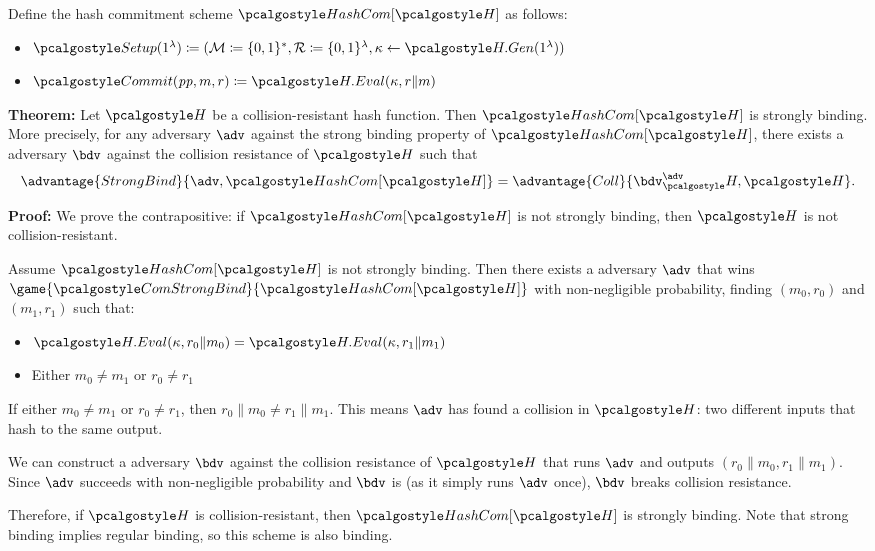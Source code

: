 \ifsolutions
\begin{mysolution}
  Define the hash commitment scheme $\algo{HashCom}[\algo{H}]$ as follows:
  \begin{itemize}
    \item $\algo{Setup}(1^\lambda) \defeq (\mathcal{M} \defeq \{0, 1\}^*, \mathcal{R} \defeq \{0, 1\}^\lambda, \kappa \gets \algo{H.Gen}(1^\lambda))$
    \item $\algo{Commit}(\params, m, r) \defeq \algo{H.Eval}(\kappa, r \| m)$
  \end{itemize}
  
  \textbf{Theorem:} Let $\algo{H}$ be a collision-resistant hash function. Then $\algo{HashCom}[\algo{H}]$ is strongly binding.
  More precisely, for any \ppt adversary $\adv$ against the strong binding property of $\algo{HashCom}[\algo{H}]$, there exists a \ppt adversary $\bdv$ against the collision resistance of $\algo{H}$ such that
  \[
  \advantage{StrongBind}{\adv, \algo{HashCom}[\algo{H}]} = \advantage{Coll}{\bdv^\adv_\algo{H}, \algo{H}}.
  \]
  
  \textbf{Proof:} We prove the contrapositive: if $\algo{HashCom}[\algo{H}]$ is not strongly binding, then $\algo{H}$ is not collision-resistant.
  
  Assume $\algo{HashCom}[\algo{H}]$ is not strongly binding.
  Then there exists a \ppt adversary $\adv$ that wins $\game{\algo{ComStrongBind}}{\algo{HashCom}[\algo{H}]}$ with non-negligible probability, finding $(m_0, r_0)$ and $(m_1, r_1)$ such that:
  \begin{itemize}
    \item $\algo{H.Eval}(\kappa, r_0 \| m_0) = \algo{H.Eval}(\kappa, r_1 \| m_1)$
    \item Either $m_0 \neq m_1$ or $r_0 \neq r_1$
  \end{itemize}
  
  If either $m_0 \neq m_1$ or $r_0 \neq r_1$, then $r_0 \| m_0 \neq r_1 \| m_1$.
  This means $\adv$ has found a collision in $\algo{H}$: two different inputs that hash to the same output.
  
  We can construct a \ppt adversary $\bdv$ against the collision resistance of $\algo{H}$ that runs $\adv$ and outputs $(r_0 \| m_0, r_1 \| m_1)$.
  Since $\adv$ succeeds with non-negligible probability and $\bdv$ is \ppt (as it simply runs $\adv$ once), $\bdv$ breaks collision resistance.
  
  Therefore, if $\algo{H}$ is collision-resistant, then $\algo{HashCom}[\algo{H}]$ is strongly binding.
  Note that strong binding implies regular binding, so this scheme is also binding.
\end{mysolution}
\fi

